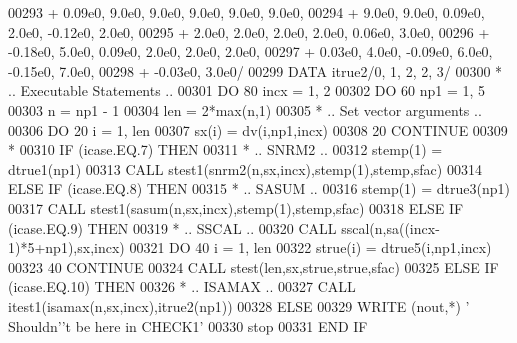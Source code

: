 \begin{DoxyCode}
00293      +                  0.09e0, 9.0e0, 9.0e0, 9.0e0, 9.0e0, 9.0e0,
00294      +                  9.0e0, 9.0e0, 0.09e0, 2.0e0, -0.12e0, 2.0e0,
00295      +                  2.0e0, 2.0e0, 2.0e0, 2.0e0, 0.06e0, 3.0e0,
00296      +                  -0.18e0, 5.0e0, 0.09e0, 2.0e0, 2.0e0, 2.0e0,
00297      +                  0.03e0, 4.0e0, -0.09e0, 6.0e0, -0.15e0, 7.0e0,
00298      +                  -0.03e0, 3.0e0/
00299       \textcolor{keyword}{DATA}              itrue2/0, 1, 2, 2, 3/
00300 \textcolor{comment}{*     .. Executable Statements ..}
00301       \textcolor{keywordflow}{DO} 80 incx = 1, 2
00302          \textcolor{keywordflow}{DO} 60 np1 = 1, 5
00303             n = np1 - 1
00304             len = 2*max(n,1)
00305 \textcolor{comment}{*           .. Set vector arguments ..}
00306             \textcolor{keywordflow}{DO} 20 i = 1, len
00307                sx(i) = dv(i,np1,incx)
00308    20       \textcolor{keywordflow}{CONTINUE}
00309 \textcolor{comment}{*}
00310             \textcolor{keywordflow}{IF} (icase.EQ.7) \textcolor{keywordflow}{THEN}
00311 \textcolor{comment}{*              .. SNRM2 ..}
00312                stemp(1) = dtrue1(np1)
00313                \textcolor{keyword}{CALL }stest1(snrm2(n,sx,incx),stemp(1),stemp,sfac)
00314             \textcolor{keywordflow}{ELSE} \textcolor{keywordflow}{IF} (icase.EQ.8) \textcolor{keywordflow}{THEN}
00315 \textcolor{comment}{*              .. SASUM ..}
00316                stemp(1) = dtrue3(np1)
00317                \textcolor{keyword}{CALL }stest1(sasum(n,sx,incx),stemp(1),stemp,sfac)
00318             \textcolor{keywordflow}{ELSE} \textcolor{keywordflow}{IF} (icase.EQ.9) \textcolor{keywordflow}{THEN}
00319 \textcolor{comment}{*              .. SSCAL ..}
00320                \textcolor{keyword}{CALL }sscal(n,sa((incx-1)*5+np1),sx,incx)
00321                \textcolor{keywordflow}{DO} 40 i = 1, len
00322                   strue(i) = dtrue5(i,np1,incx)
00323    40          \textcolor{keywordflow}{CONTINUE}
00324                \textcolor{keyword}{CALL }stest(len,sx,strue,strue,sfac)
00325             \textcolor{keywordflow}{ELSE} \textcolor{keywordflow}{IF} (icase.EQ.10) \textcolor{keywordflow}{THEN}
00326 \textcolor{comment}{*              .. ISAMAX ..}
00327                \textcolor{keyword}{CALL }itest1(isamax(n,sx,incx),itrue2(np1))
00328             \textcolor{keywordflow}{ELSE}
00329                \textcolor{keyword}{WRITE} (nout,*) \textcolor{stringliteral}{' Shouldn'}\textcolor{stringliteral}{'t be here in CHECK1'}
00330                stop
00331 \textcolor{keywordflow}{            END IF}

\end{DoxyCode}
